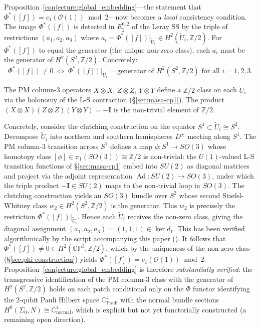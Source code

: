 \documentclass[11pt,a4paper]{article}
\theoremstyle{remark}
\newcommand{\CP}{\mathbb{CP}}
\newcommand{\C}{\mathbb{C}}
\newcommand{\Z}{\mathbb{Z}}
\newcommand{\cO}{\mathcal{O}}
\begin{document}
Proposition~\ref{conjecture:global_embedding}---the statement that
$\Phi^*([f]) = c_1(\cO(1)) \bmod 2$---now becomes a \emph{local}
consistency condition.  The image $\Phi^*([f])$ is detected in
$E_2^{0,2}$ of the Leray SS by the triple of restrictions
$(a_1,a_2,a_3)$ where $a_i = \Phi^*([f])|_{\tilde{U}_i}
\in H^2(\tilde{U}_i, \Z/2)$.  For $\Phi^*([f])$ to equal the
generator (the unique non-zero class), each $a_i$ must be the
generator of $H^2(S^2, \Z/2)$.  Concretely:
\[
  \Phi^*([f]) \neq 0 \;\iff\;
  \Phi^*([f])|_{\tilde{U}_i} = \text{generator of } H^2(S^2, \Z/2)
  \text{ for all } i = 1,2,3.
\]

The PM column-3 operators $X \otimes X$, $Z \otimes Z$, $Y \otimes Y$
define a $\Z/2$ class on each $\tilde{U}_i$ via the holonomy of the
L-S contraction (\S\ref{sec:masa-cp1}).  The product
$(X \otimes X)(Z \otimes Z)(Y \otimes Y) = -\mathbf{I}$ is the
non-trivial element of $\Z/2$.

Concretely, consider the clutching construction on the equator
$S^1 \subset \tilde{U}_i \cong S^2$.  Decompose $\tilde{U}_i$ into
northern and southern hemispheres $D^\pm$ meeting along $S^1$.
The PM column-3 transition across $S^1$ defines a map
$\phi: S^1 \to SO(3)$ whose homotopy class
$[\phi] \in \pi_1(SO(3)) \cong \Z/2$ is non-trivial: the $U(1)$-valued
L-S transition functions of \S\ref{sec:masa-cp1} embed into $SU(2)$
as diagonal matrices and project via the adjoint representation
$\operatorname{Ad}: SU(2) \to SO(3)$, under which the triple product
$-\mathbf{I} \in SU(2)$ maps to the non-trivial loop in $SO(3)$.  The clutching
construction yields an $SO(3)$ bundle over $S^2$ whose second
Stiefel-Whitney class $w_2 \in H^2(S^2, \Z/2)$ is the generator.
This $w_2$ is precisely the restriction
$\Phi^*([f])|_{\tilde{U}_i}$.  Hence each $\tilde{U}_i$ receives
the non-zero class, giving the diagonal assignment
$(a_1,a_2,a_3) = (1,1,1) \in \ker d_1$.  This has been verified
algorithmically by the script accompanying this paper
(\cite{ScriptConj42}).  It follows that
$\Phi^*([f]) \neq 0 \in H^2(\CP^3, \Z/2)$, which by the
uniqueness of the non-zero class (\S\ref{sec:phi-construction})
yields $\Phi^*([f]) = c_1(\cO(1)) \bmod 2$.  Proposition~\ref{conjecture:global_embedding} is
therefore \emph{substantially verified}: the transgressive identification
of the PM column-3 class with the generator of $H^2(S^2, \Z/2)$ holds
on each patch conditional only on the $\Phi$ functor identifying the
2-qubit Pauli Hilbert space $\C^4_{\text{Pauli}}$ with the normal bundle
sections $H^0(\Sigma_0, N) \cong \C^4_{\text{normal}}$, which is explicit
but not yet functorially constructed (a remaining open direction).
\end{document}

